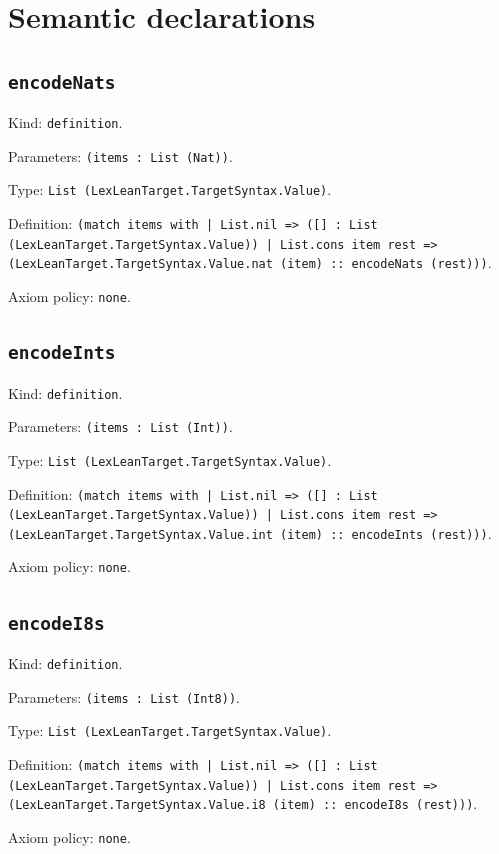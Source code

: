 \documentclass[11pt]{article}
\begin{document}
\section*{Semantic declarations}
\subsection*{\texttt{encodeNats}}
\noindent Kind: \texttt{definition}.\par
\noindent Parameters: \texttt{(items : List (Nat))}.\par
\noindent Type: \texttt{List (LexLeanTarget.TargetSyntax.Value)}.\par
\noindent Definition: \texttt{(match items with | List.nil => ([] : List (LexLeanTarget.TargetSyntax.Value)) | List.cons item rest => (LexLeanTarget.TargetSyntax.Value.nat (item) :: encodeNats (rest)))}.\par
\noindent Axiom policy: \texttt{none}.\par
\subsection*{\texttt{encodeInts}}
\noindent Kind: \texttt{definition}.\par
\noindent Parameters: \texttt{(items : List (Int))}.\par
\noindent Type: \texttt{List (LexLeanTarget.TargetSyntax.Value)}.\par
\noindent Definition: \texttt{(match items with | List.nil => ([] : List (LexLeanTarget.TargetSyntax.Value)) | List.cons item rest => (LexLeanTarget.TargetSyntax.Value.int (item) :: encodeInts (rest)))}.\par
\noindent Axiom policy: \texttt{none}.\par
\subsection*{\texttt{encodeI8s}}
\noindent Kind: \texttt{definition}.\par
\noindent Parameters: \texttt{(items : List (Int8))}.\par
\noindent Type: \texttt{List (LexLeanTarget.TargetSyntax.Value)}.\par
\noindent Definition: \texttt{(match items with | List.nil => ([] : List (LexLeanTarget.TargetSyntax.Value)) | List.cons item rest => (LexLeanTarget.TargetSyntax.Value.i8 (item) :: encodeI8s (rest)))}.\par
\noindent Axiom policy: \texttt{none}.\par
\end{document}
